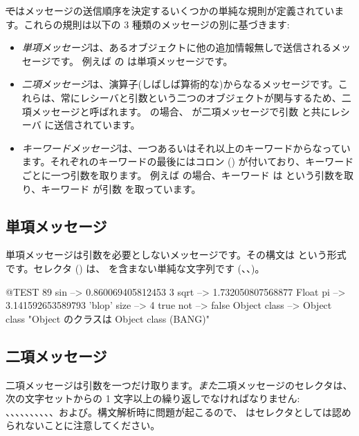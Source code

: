 \documentclass[a4paper,10pt,twoside]{book}
\begin{document}
\st ではメッセージの送信順序を決定するいくつかの単純な規則が定義されています。これらの規則は以下の 3 種類のメッセージの別に基づきます:
\begin{itemize}
\item \emph{単項メッセージ}は、あるオブジェクトに他の追加情報無しで送信されるメッセージです。 例えば  の  は単項メッセージです。
\item  \emph{二項メッセージ}は、演算子(しばしば算術的な)からなるメッセージです。これらは、常にレシーバと引数という二つのオブジェクトが関与するため、二項メッセージと呼ばれます。 の場合、\ct{+} が二項メッセージで引数  と共にレシーバ  に送信されています。
\item  \emph{キーワードメッセージ}は、一つあるいはそれ以上のキーワードからなっています。それぞれのキーワードの最後にはコロン (\ct{:}) が付いており、キーワードごとに一つ引数を取ります。
例えば  の場合、キーワード  は  という引数を取り、キーワード  が引数  を取っています。
\end{itemize}

\subsection{単項メッセージ}
単項メッセージは引数を必要としないメッセージです。その構文は  という形式です。セレクタ () は、\ct{:} を含まない単純な文字列です (\eg {}、、)。
\begin{code}{@TEST}
89 sin           --> 0.860069405812453
3 sqrt           --> 1.732050807568877
Float pi         --> 3.141592653589793
'blop' size     --> 4
true not        --> false
Object class --> Object class  "Object のクラスは Object class (BANG)"
\end{code}


\subsection{二項メッセージ} 
二項メッセージは引数を一つだけ取ります。\emph{また}二項メッセージのセレクタは、次の文字セットからの 1 文字以上の繰り返しでなければなりません: \ct{+}、\ct{-}、\ct{*}、\ct{/}、\ct{\&}、\ct{=}、\ct{>}、\ct{|}、\ct{<}、\ct{\~}、および。構文解析時に問題が起こるので、\ct{--} はセレクタとしては認められないことに注意してください。
\end{document}
